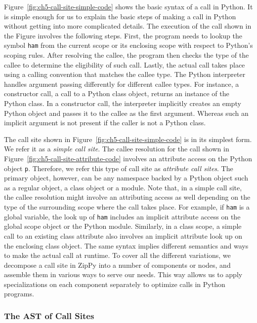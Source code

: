 Figure~\ref{fig:ch5-call-site-simple-code} shows the basic syntax of a call in Python.
It is simple enough for us to explain the basic steps of making a call in Python without getting into more complicated details.
The execution of the call shown in the Figure involves the following steps.
First, the program needs to lookup the symbol \texttt{ham} from the current scope or its enclosing scope with respect to Python's scoping rules.
After resolving the callee, the program then checks the type of the callee to determine the eligibility of such call.
Lastly, the actual call takes place using a calling convention that matches the callee type.
The Python interpreter handles argument passing differently for different callee types.
For instance, a constructor call, a call to a Python class object, returns an instance of the Python class.
In a constructor call, the interpreter implicitly creates an empty Python object and passes it to the callee as the first argument.
Whereas such an implicit argument is not present if the caller is not a Python class.

The call site shown in Figure~\ref{fig:ch5-call-site-simple-code} is in its simplest form.
We refer it as a \emph{simple call site}.
The callee resolution for the call shown in Figure~\ref{fig:ch5-call-site-attribute-code} involves an attribute access on the Python object \texttt{p}.
Therefore, we refer this type of call site as \emph{attribute call sites}.
The primary object, however, can be any namespace backed by a Python object such as a regular object, a class object or a module.
Note that, in a simple call site, the callee resolution might involve an attributing access as well depending on the type of the surrounding scope where the call takes place.
For example, if \texttt{ham} is a global variable, the look up of \texttt{ham} includes an implicit attribute access on the global scope object or the Python module.
Similarly, in a class scope, a simple call to an existing class attribute also involves an implicit attribute look up on the enclosing class object.
The same syntax implies different semantics and ways to make the actual call at runtime.
To cover all the different variations, we decompose a call site in ZipPy into a number of components or nodes, and assemble them in various ways to serve our needs.
This way allows us to apply specializations on each component separately to optimize calls in Python programs.

\subsubsection{The AST of Call Sites}

